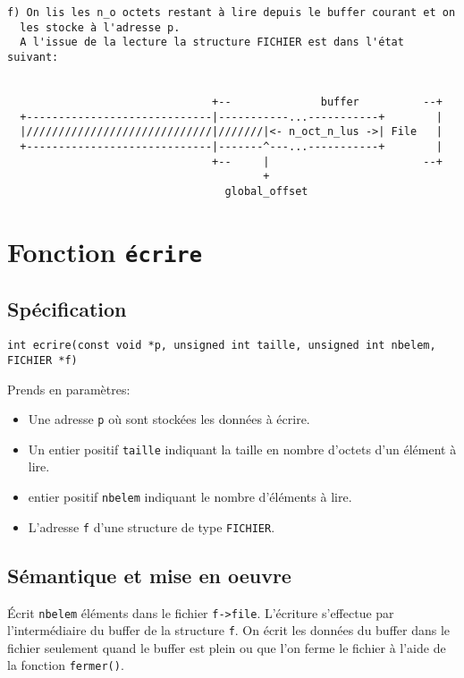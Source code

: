\documentclass[11pt]{article}
\theoremstyle{definition}
\theoremstyle{definition}
\begin{document}
\begin{lstlisting}[columns=fixed,basicstyle=\scriptsize\ttfamily]
  f) On lis les n_o octets restant à lire depuis le buffer courant et on
  les stocke à l'adresse p.
  A l'issue de la lecture la structure FICHIER est dans l'état suivant:


                                +--              buffer          --+
  +-----------------------------|-----------...-----------+        |
  |/////////////////////////////|///////|<- n_oct_n_lus ->| File   |
  +-----------------------------|-------^---...-----------+        |
                                +--     |                        --+
                                        +
                                  global_offset
\end{lstlisting}






\section{Fonction \texttt{écrire}}
\subsection{Spécification}
\texttt{int ecrire(const void *p, unsigned int taille, unsigned int nbelem, FICHIER *f)}

Prends en paramètres:
\begin{itemize}
\item Une adresse \texttt{p} où sont stockées les données à écrire.
\item Un entier positif \texttt{taille} indiquant la taille en nombre d'octets d'un élément à lire.
\item entier positif \texttt{nbelem} indiquant le nombre d'éléments à lire.
\item L'adresse \texttt{f} d'une structure de type \texttt{FICHIER}.
\end{itemize}

\subsection{Sémantique et mise en oeuvre}
Écrit \texttt{nbelem} éléments dans le fichier \texttt{f->file}. L'écriture s'effectue par l'intermédiaire
du buffer de la structure \texttt{f}. On écrit les données du buffer dans le fichier seulement quand le
buffer est plein ou que l'on ferme le fichier à l'aide de la fonction \texttt{fermer()}.
\end{document}
